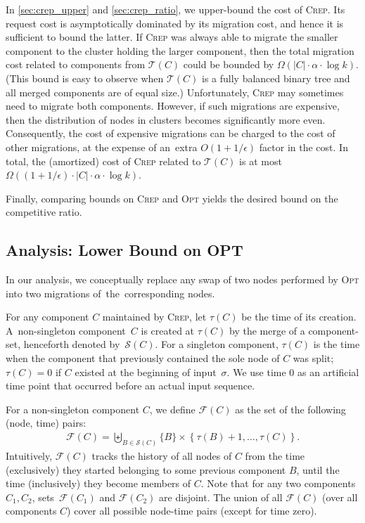 \documentclass{siamart190516}
\newcommand{\OPT}{\textsc{Opt}\xspace}
\newcommand{\CREP}{\textsc{Crep}\xspace}
\newcommand{\T}{\mathcal{T}}
\newcommand{\eps}{\ensuremath{\epsilon}}
\newcommand{\set}{\mathcal{S}}
\newcommand{\F}{\mathcal{F}}
\begin{document}
In \cref{sec:crep_upper} and \cref{sec:crep_ratio}, we upper-bound the cost of
\CREP. Its request cost is asymptotically dominated by its migration cost, and
hence it is sufficient to bound the latter. If \CREP was always able to migrate
the smaller component to the cluster holding the larger component, then the
total migration cost related to components from $\T(C)$ could be bounded by
$\Omega(|C| \cdot \alpha \cdot \log k)$. (This bound is easy to observe when
$\T(C)$ is a fully balanced binary tree and all merged components are of equal
size.) Unfortunately, \CREP may sometimes need to migrate both components. 
However, if such migrations are expensive, then the
distribution of nodes in clusters becomes significantly more even. Consequently, 
the cost of expensive migrations can be charged to the cost of other migrations,
at the expense of an~extra $O(1 + 1/\eps)$ factor in the cost.
In total, the (amortized) cost of \CREP related to $\T(C)$ is at most
$\Omega((1+1/\eps) \cdot |C| \cdot \alpha \cdot \log k)$.

Finally, comparing bounds on \CREP and \OPT yields the desired bound on the
competitive ratio.



\subsection{Analysis: Lower Bound on OPT}
\label{sec:opt_lower}

In our analysis, we conceptually
replace any swap of two nodes performed by \OPT into two migrations of~the~corresponding nodes.

For any component $C$ maintained by \CREP, let $\tau(C)$ be the time of its
creation. A~non-singleton component~$C$ is created at $\tau(C)$ by the merge
of a component-set, henceforth denoted by~$\set(C)$. For a singleton component,
$\tau(C)$ is the time when the component that previously contained the sole
node of $C$ was split; $\tau(C) = 0$ if $C$ existed at the beginning of
input~$\sigma$. We use time $0$ as an artificial time point that occurred
before an actual input sequence.

For a non-singleton component $C$, we 
define $\F(C)$ as the set of the following (node, time) pairs:
\begin{align*}
	\F(C) = \biguplus_{B \in \set(C)} \{ B \}  \times \left\{ \tau(B)+1, \ldots, \tau(C) \right\}.
\end{align*}
Intuitively, $\F(C)$ tracks the history of all nodes of $C$ from the time 
(exclusively) they started belonging to some previous component $B$, until the time 
(inclusively) they become members of $C$. Note that for any two components 
$C_1,C_2$, sets~$\F(C_1)$ and $\F(C_2)$ are disjoint.
The union of all $\F(C)$ (over all components $C$) 
cover all possible node-time pairs (except for time zero). 
\end{document}
